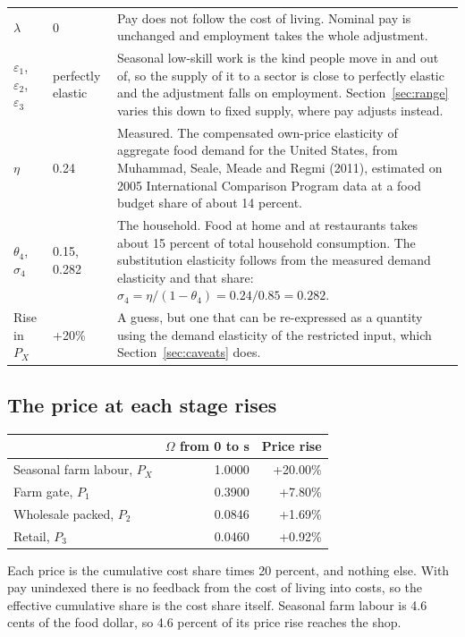 \documentclass[11pt,a4paper]{article}
\begin{document}
\begin{table}[htbp]
\begin{tabularx}{\textwidth}{l l X}
$\lambda$ & 0 & Pay does not follow the cost of living. Nominal pay is unchanged and employment takes the whole adjustment. \\
$\varepsilon_1$, $\varepsilon_2$, $\varepsilon_3$ & perfectly elastic & Seasonal low-skill work is the kind people move in and out of, so the supply of it to a sector is close to perfectly elastic and the adjustment falls on employment. Section~\ref{sec:range} varies this down to fixed supply, where pay adjusts instead. \\
$\eta$ & 0.24 & Measured. The compensated own-price elasticity of aggregate food demand for the United States, from Muhammad, Seale, Meade and Regmi (2011), estimated on 2005 International Comparison Program data at a food budget share of about 14 percent. \\
$\theta_4$, $\sigma_4$ & 0.15, 0.282 & The household. Food at home and at restaurants takes about 15 percent of total household consumption. The substitution elasticity follows from the measured demand elasticity and that share: $\sigma_4 = \eta/(1-\theta_4) = 0.24/0.85 = 0.282$. \\
Rise in $P_X$ & +20\% & A guess, but one that can be re-expressed as a quantity using the demand elasticity of the restricted input, which Section~\ref{sec:caveats} does. \\
\bottomrule
\end{tabularx}
\end{table}

\subsection{The price at each stage rises}
\label{sec:prices}

\begin{center}
\small
\begin{tabular}{lrr}
\toprule
 & \textbf{$\Omega$ from 0 to s} & \textbf{Price rise} \\
\midrule
Seasonal farm labour, $P_X$ & 1.0000 & +20.00\% \\
Farm gate, $P_{1}$ & 0.3900 & \phantom{0}+7.80\% \\
Wholesale packed, $P_{2}$ & 0.0846 & \phantom{0}+1.69\% \\
Retail, $P_{3}$ & 0.0460 & \phantom{0}+0.92\% \\
\bottomrule
\end{tabular}
\end{center}

Each price is the cumulative cost share times 20 percent, and nothing else. With pay unindexed there is no feedback from the cost of living into costs, so the effective cumulative share is the cost share itself. Seasonal farm labour is 4.6 cents of the food dollar, so 4.6 percent of its price rise reaches the shop.
\end{document}
